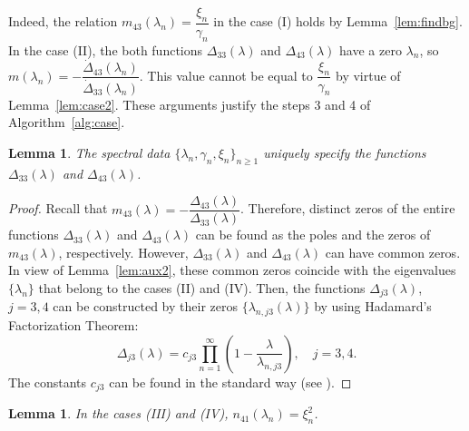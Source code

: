 \documentclass[a4paper,12pt]{article}
\newcommand{\ga}{\gamma}
\newcommand{\la}{\lambda}
\theoremstyle{plain}
\numberwithin{equation}{section}
\newtheorem{lem}[thm]{Lemma}
\theoremstyle{definition}
\theoremstyle{remark}
\begin{document}
Indeed, the relation $m_{43}(\la_n) = \dfrac{\xi_n}{\ga_n}$ in the case (I) holds by Lemma~\ref{lem:findbg}. In the case (II), the both functions $\Delta_{33}(\la)$ and $\Delta_{43}(\la)$ have a zero $\la_n$, so $m(\la_n) = -\dfrac{\dot\Delta_{43}(\la_n)}{\dot \Delta_{33}(\la_n)}$. This value cannot be equal to $\dfrac{\xi_n}{\gamma_n}$ by virtue of Lemma~\ref{lem:case2}. These arguments justify the steps 3 and 4 of Algorithm~\ref{alg:case}.

\begin{lem} \label{lem:recD}
The spectral data $\{ \la_n, \ga_n, \xi_n \}_{n \ge 1}$ uniquely specify the functions $\Delta_{33}(\la)$ and $\Delta_{43}(\la)$.
\end{lem}

\begin{proof}
Recall that $m_{43}(\la) = -\dfrac{\Delta_{43}(\la)}{\Delta_{33}(\la)}$. Therefore, distinct zeros of the entire functions $\Delta_{33}(\la)$ and $\Delta_{43}(\la)$ can be found as the poles and the zeros of $m_{43}(\la)$, respectively. However, $\Delta_{33}(\la)$ and $\Delta_{43}(\la)$ can have common zeros. In view of Lemma~\ref{lem:aux2}, these common zeros coincide with the eigenvalues $\{ \la_n \}$ that belong to the cases (II) and (IV). Then, the functions $\Delta_{j3}(\la)$, $j = 3,4$ can be constructed by their zeros $\{\la_{n,j3}(\la)\}$ by using Hadamard's Factorization Theorem:
$$
\Delta_{j3}(\la) = c_{j3} \prod_{n = 1}^{\infty} \left(1 - \frac{\la}{\la_{n,j3}} \right), \quad j = 3, 4.
$$
The constants $c_{j3}$ can be found in the standard way (see \cite[Theorem 1.1.4]{FY01}).
\end{proof}

\begin{lem} \label{lem:cases34}
In the cases (III) and (IV), $n_{41}(\la_n) = \xi_n^2$.
\end{lem}
\end{document}
